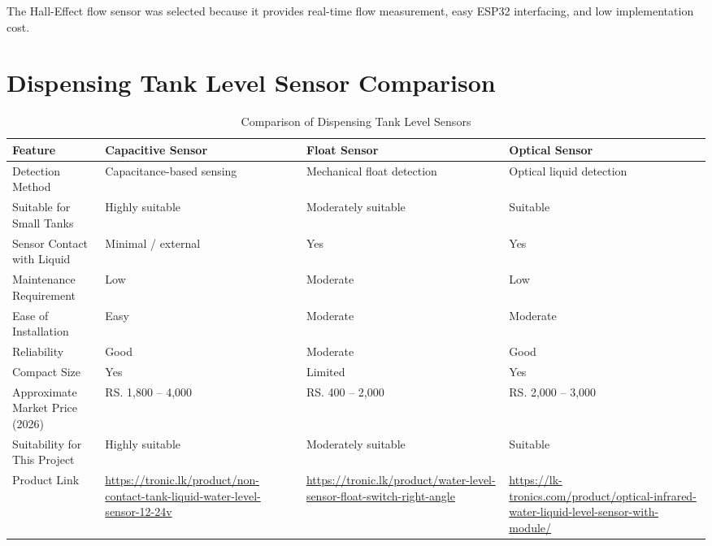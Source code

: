\documentclass[12pt,a4paper]{report}
\begin{document}
The Hall-Effect flow sensor was selected because it provides real-time flow measurement, easy ESP32 interfacing, and low implementation cost.

\section{Dispensing Tank Level Sensor Comparison}

\begin{table}[H]
\centering
\small
\begin{tabularx}{\textwidth}{|p{3cm}|>{\raggedright\arraybackslash}X|>{\raggedright\arraybackslash}X|>{\raggedright\arraybackslash}X|}
\hline
\textbf{Feature} & \textbf{Capacitive Sensor} & \textbf{Float Sensor} & \textbf{Optical Sensor} \\
\hline

Detection Method &
Capacitance-based sensing &
Mechanical float detection &
Optical liquid detection \\
\hline

Suitable for Small Tanks &
Highly suitable &
Moderately suitable &
Suitable \\
\hline

Sensor Contact with Liquid &
Minimal / external &
Yes &
Yes \\
\hline

Maintenance Requirement &
Low &
Moderate &
Low \\
\hline

Ease of Installation &
Easy &
Moderate &
Moderate \\
\hline

Reliability &
Good &
Moderate &
Good \\
\hline

Compact Size &
Yes &
Limited &
Yes \\
\hline

Approximate Market Price (2026) &
RS. 1,800 -- 4,000 &
RS. 400 -- 2,000 &
RS. 2,000 -- 3,000 \\
\hline

Suitability for This Project &
Highly suitable &
Moderately suitable &
Suitable \\
\hline

Product Link &
\url{https://tronic.lk/product/non-contact-tank-liquid-water-level-sensor-12-24v} &
\url{https://tronic.lk/product/water-level-sensor-float-switch-right-angle} &
\url{https://lk-tronics.com/product/optical-infrared-water-liquid-level-sensor-with-module/} \\
\hline

\end{tabularx}
\caption{Comparison of Dispensing Tank Level Sensors}
\end{table}
\end{document}
